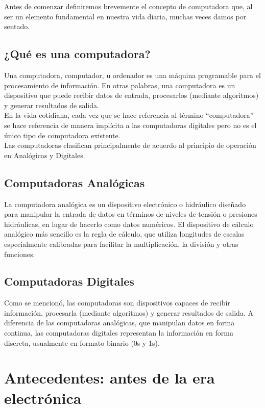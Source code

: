 \documentclass[10pt,letterpaper,twocolumn]{article}
\begin{document}
Antes de comenzar definiremos brevemente el concepto de computadora que, al ser 
un elemento fundamental en nuestra vida diaria, muchas veces damos por sentado.

\subsection{¿Qué es una computadora?}
Una computadora, computador, u ordenador es una máquina programable para el 
procesamiento de información. En otras palabras, una computadora es un 
dispositivo que puede recibir datos de entrada, procesarlos (mediante 
algoritmos) y generar resultados de salida. \\
En la vida cotidiana, cada vez que se hace referencia al término ``computadora'' 
se hace referencia de manera implícita a las computadoras digitales pero no es el
único tipo de computadora existente.\\
Las computadoras clasifican principalmente de acuerdo al 
principio de operación en Analógicas y Digitales.

\subsection{Computadoras Analógicas}
La computadora analógica es un dispositivo electrónico o hidráulico diseñado 
para manipular la entrada de datos en términos de niveles de 
tensión o presiones hidráulicas, en lugar de hacerlo como datos numéricos. 
El dispositivo de cálculo analógico más sencillo es la regla de cálculo, que 
utiliza longitudes de escalas especialmente calibradas para facilitar 
la multiplicación, la división y otras funciones.

\subsection{Computadoras Digitales}
Como se mencionó, las computadoras son dispositivos capaces de recibir 
información, 
procesarla (mediante algoritmos) y generar resultados de salida. A diferencia de
las computadoras analógicas, que manipulan datos en forma continua, 
las computadoras digitales representan la información en forma discreta,
usualmente en formato binario (0s y 1s).


\section{Antecedentes: antes de la era electrónica}
\end{document}
